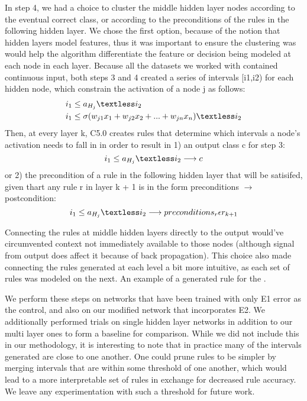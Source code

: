 In step 4, we had a choice to cluster the middle hidden layer nodes
according to the eventual correct class, or according to the
preconditions of the rules in the following hidden layer. We chose the
first option, because of the notion that hidden layers model features,
thus it was important to ensure the clustering was would help the
algorithm differentiate the feature or decision being modeled at each
node in each layer. Because all the datasets we worked with contained
continuous input, both steps 3 and 4 created a series of intervals [i1,i2) for
each hidden node, which constrain the activation of a node j as
follows:
\begin{equation}
  \begin{split}
    &i_1 \le a_{H_j} \textless i_2 \\
    &i_1 \le \sigma(w_{j1}x_1 + w_{j2}x_2 + ... + w_{jn}x_n)  \textless i_2
  \end{split}
\end{equation}
Then, at every layer k, C5.0 creates rules that determine which intervals a node's
activation needs to fall in in order to result in 1) an output class c
for step 3:
\begin{equation}
  i_1 \le a_{H_j} \textless i_2  \longrightarrow  c
\end{equation}
or 2) the precondition of a rule in the following hidden layer that
will be satisifed, given thart any rule r in layer k + 1 is in the form preconditions
$\longrightarrow$ postcondition:
\begin{equation}
  i_1 \le a_{H_j}  \textless i_2  \longrightarrow preconditions_r \epsilon r_{k+1}
\end{equation}

 Connecting the rules at middle hidden layers directly to the output
 would’ve circumvented context not immediately available to those
 nodes (although signal from output does affect it because of back
 propagation). This choice also made connecting the rules generated at
 each level a bit more intuitive, as each set of rules was modeled on
 the next. An example of a generated rule for the .

We perform these steps on networks that have been trained with only E1
error as the control, and also on our modified network that
incorporates E2. We additionally performed trials on single hidden
layer networks in addition to our multi layer ones to form a baseline
for comparison. While we did not include this in our methodology, it
is interesting to note that in practice many of the intervals generated are close
to one another. One could prune rules to be simpler by merging
intervals that are within some threshold of one another, which would
lead to a more interpretable set of rules in exchange for decreased
rule accuracy. We leave any experimentation with such a threshold for
future work. 

